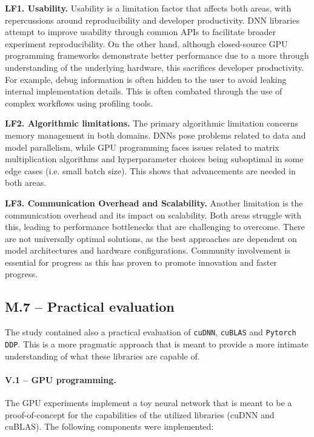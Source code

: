 \textbf{LF1. Usability.}
Usability is a limitation factor that affects both areas, with repercussions around reproducibility and developer
productivity. DNN libraries attempt to improve usability through common APIs to facilitate broader
experiment reproducibility. On the other hand, although closed-source GPU programming frameworks
demonstrate better performance due to a more through understanding of the underlying hardware, this sacrifices
developer productivity. For example, debug information is often hidden to the user to avoid leaking
internal implementation details. This is often combated through the use of complex workflows using
profiling tools.

\textbf{LF2. Algorithmic limitations.}
The primary algorithmic limitation concerns memory management in both domains.
DNNs pose problems related to data and model parallelism, while GPU programming faces issues
related to matrix multiplication algorithms and hyperparameter choices being suboptimal in some edge cases
(i.e. small batch size). This shows that advancements are needed in both areas.

\textbf{LF3. Communication Overhead and Scalability.}
Another limitation is the communication overhead and its impact on scalability. Both areas struggle
with this, leading to performance bottlenecks that are challenging to overcome. There are not universally
optimal solutions, as the best approaches are dependent on model architectures and hardware configurations.
Community involvement is essential for progress as this has proven to promote innovation and faster progress.

\subsection{M.7 -- Practical evaluation}
\label{sec:study_selection_results}
The study contained also a practical evaluation of \texttt{cuDNN}, \texttt{cuBLAS} and \texttt{Pytorch DDP}.
This is a more pragmatic approach that is meant to provide a more intimate understanding of what
these libraries are capable of.

\paragraph{V.1 -- GPU programming.}
The GPU experiments implement a toy neural network that is meant to be a proof-of-concept for
the capabilities of the utilized libraries (cuDNN and cuBLAS). The following components were implemented:

